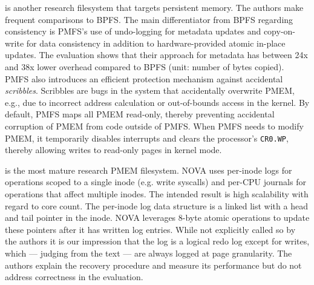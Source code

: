 \documentclass[12pt,a4paper,twoside]{book}
\begin{document}
 is another research filesystem that targets persistent memory.
The authors make frequent comparisons to BPFS.
The main differentiator from BPFS regarding consistency is PMFS’s use of undo-logging for metadata updates and copy-on-write for data consistency in addition to hardware-provided atomic in-place updates.
The evaluation shows that their approach for metadata has between 24x and 38x lower overhead compared to BPFS (unit: number of bytes copied).
PMFS also introduces an efficient protection mechanism against accidental \textit{scribbles}.
Scribbles are bugs in the system that accidentally overwrite PMEM, e.g., due to incorrect address calculation or out-of-bounds access in the kernel.
By default, PMFS maps all PMEM read-only, thereby preventing accidental corruption of PMEM from code outside of PMFS.
When PMFS needs to modify PMEM, it temporarily disables interrupts and clears the processor's \lstinline{CR0.WP}, thereby allowing writes to read-only pages in kernel mode.~\cite{dulloorSystemSoftwarePersistent2014,intelSdmCr0WpFlag}

 is the most mature research PMEM filesystem.
NOVA uses per-inode logs for operations scoped to a single inode (e.g. write syscalls) and per-CPU journals for operations that affect multiple inodes.
The intended result is high scalability with regard to core count.
The per-inode log data structure is a linked list with a head and tail pointer in the inode.
NOVA leverages 8-byte atomic operations to update these pointers after it has written log entries.
While not explicitly called so by the authors it is our impression that the log is a logical redo log except for writes, which --- judging from the text --- are always logged at page granularity.
The authors explain the recovery procedure and measure its performance but do not address correctness in the evaluation.
\end{document}
